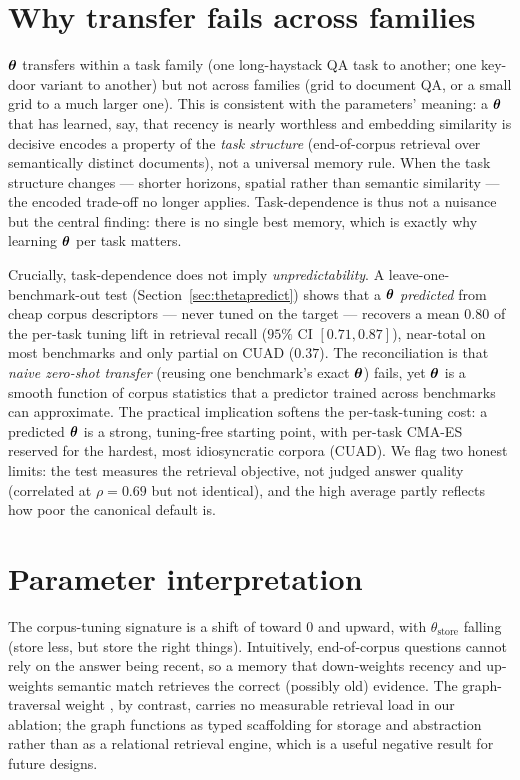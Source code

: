 \section{Why transfer fails across families}
$\boldsymbol{\theta}$ transfers within a task family (one long-haystack QA task to another;
one key-door variant to another) but not across families (grid to document QA, or
a small grid to a much larger one). This is consistent with the parameters'
meaning: a $\boldsymbol{\theta}$ that has learned, say, that recency is nearly worthless
and embedding similarity is decisive encodes a property of the \emph{task
structure} (end-of-corpus retrieval over semantically distinct documents), not a
universal memory rule. When the task structure changes --- shorter horizons,
spatial rather than semantic similarity --- the encoded trade-off no longer
applies. Task-dependence is thus not a nuisance but the central finding:
there is no single best memory, which is exactly why learning $\boldsymbol{\theta}$ per
task matters.

Crucially, task-dependence does not imply \emph{unpredictability}. A
leave-one-benchmark-out test (Section~\ref{sec:thetapredict}) shows that a
$\boldsymbol{\theta}$ \emph{predicted} from cheap corpus descriptors --- never tuned on the
target --- recovers a mean $0.80$ of the per-task tuning lift in retrieval recall
($95\%$ CI $[0.71,0.87]$), near-total on most benchmarks and only partial on CUAD
($0.37$). The reconciliation is that \emph{naive zero-shot transfer} (reusing one
benchmark's exact $\boldsymbol{\theta}$) fails, yet $\boldsymbol{\theta}$ is a smooth function of
corpus statistics that a predictor trained across benchmarks can approximate. The
practical implication softens the per-task-tuning cost: a predicted $\boldsymbol{\theta}$
is a strong, tuning-free starting point, with per-task CMA-ES reserved for the
hardest, most idiosyncratic corpora (CUAD). We flag two honest limits: the test
measures the retrieval objective, not judged answer quality (correlated at
$\rho{=}0.69$ but not identical), and the high average partly reflects how poor
the canonical default is.

\section{Parameter interpretation}
The corpus-tuning signature is a shift of \wrec{} toward $0$ and \wembed{}
upward, with $\theta_{\mathrm{store}}$ falling (store less, but store the right
things). Intuitively, end-of-corpus questions cannot rely on the answer being
recent, so a memory that down-weights recency and up-weights semantic match
retrieves the correct (possibly old) evidence. The graph-traversal weight
\wgraph{}, by contrast, carries no measurable retrieval load in our ablation;
the graph functions as typed scaffolding for storage and abstraction rather than
as a relational retrieval engine, which is a useful negative result for future
designs.

